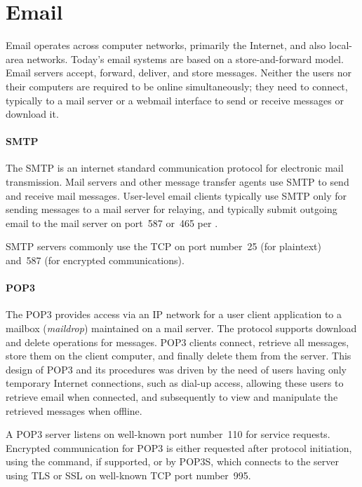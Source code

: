 \section{Email}
Email operates across computer networks, primarily the Internet, and also local-area networks.
Today's email systems are based on a store-and-forward model.
Email servers accept, forward, deliver, and store messages.
Neither the users nor their computers are required to be online simultaneously; they need to connect, typically to a mail server or a webmail interface to send or receive messages or download it.


\paragraph{\acs{SMTP}}
The \acl{SMTP} is an internet standard communication protocol for electronic mail transmission.
Mail servers and other message transfer agents use \acs{SMTP} to send and receive mail messages.
User-level email clients typically use \acs{SMTP} only for sending messages to a mail server for relaying, and typically submit outgoing email to the mail server on port~587 or~465 per .

\acs{SMTP} servers commonly use the \acf{TCP} on port number~25 (for plaintext) and~587 (for encrypted communications).


\paragraph{\acs{POP3}}
The \acl{POP3} provides access via an \acs{IP} network for a user client application to a mailbox (\emph{maildrop}) maintained on a mail server.
The protocol supports download and delete operations for messages.
\acs{POP3} clients connect, retrieve all messages, store them on the client computer, and finally delete them from the server.
This design of \acs{POP3} and its procedures was driven by the need of users having only temporary Internet connections, such as dial-up access, allowing these users to retrieve email when connected, and subsequently to view and manipulate the retrieved messages when offline.

A \acs{POP3} server listens on well-known port number~110 for service requests.
Encrypted communication for \acs{POP3} is either requested after protocol initiation, using the  command, if supported, or by \acs{POP3S}, which connects to the server using \acs{TLS} or \acs{SSL} on well-known \acs{TCP} port number~995.


